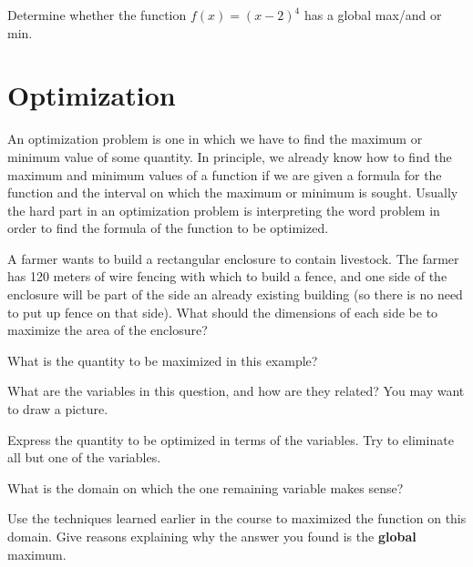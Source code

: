 \vfill


\newpage
\problem Determine whether the function $f(x) = (x-2)^4$ has a global
  max/and or min.

\vfill

\newpage

\section*{Optimization}

\vsc

An optimization problem is one in which we have to find the maximum or
minimum value of some quantity.  In principle, we already know how to
find the maximum and minimum values of a function if we are given a
formula for the function and the interval on which the maximum or
minimum is sought.  Usually the hard part in an optimization problem
is interpreting the word problem in order to find the formula of the
function to be optimized.

\vsc 

\newpage 

\problem A farmer wants to build a rectangular enclosure to contain
  livestock.  The farmer has 120 meters of wire fencing with which to
  build a fence, and one side of the enclosure will be part of the
  side an already existing building (so there is no need to put up
  fence on that side). What should the dimensions of each side be to
  maximize the area of the enclosure? 

\vsc


What is the quantity to be maximized in this example?

\vspace{2cm}

\newpage

What are the variables in this question, and how are they
  related?  You may want to draw a picture.

\vfill

Express the quantity to be optimized in terms of the
  variables.  Try to eliminate all but one of the variables.

  \vfill

  What is the domain on which the one remaining variable
    makes sense?

\vspace{2cm} 
  \newpage 

Use the techniques learned earlier in the course to
  maximized the function on this domain.  Give reasons explaining why
  the answer you found is the {\bf global} maximum.

